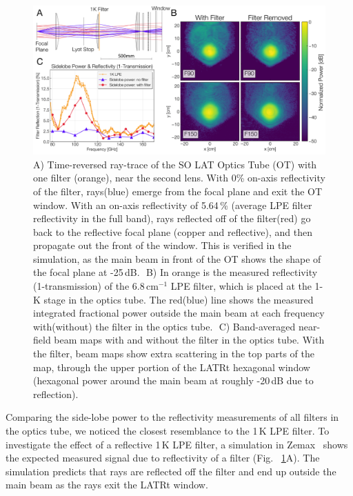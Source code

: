 \begin{figure}[t]
    \centering
    \includegraphics[width = .95\textwidth]{Figures/filter_fig.pdf}
    \caption{A) Time-reversed ray-trace of the SO LAT Optics Tube (OT) with one filter (orange), near the second lens.  With 0\% on-axis reflectivity of the filter, rays(blue) emerge from the focal plane and exit the OT window.  With an on-axis reflectivity of 5.64\,\% (average LPE filter reflectivity in the full band), rays reflected off of the filter(red) go back to the reflective focal plane (copper and reflective), and then propagate out the front of the window.  This is verified in the simulation, as the main beam in front of the OT shows the shape of the focal plane at -25\,dB.  \,\,B) In orange is the measured reflectivity (1-transmission) of the 6.8\,cm$^{-1}$ LPE filter, which is placed at the 1-K stage in the optics tube.  The red(blue) line shows the measured integrated fractional power outside the main beam at each frequency with(without) the filter in the optics tube.  \,\,C) Band-averaged near-field beam maps with and without the filter in the optics tube.  With the filter, beam maps show extra scattering in the top parts of the map, through the upper portion of the LATRt hexagonal window (hexagonal power around the main beam at roughly -20\,dB due to reflection).}
    \label{fig:filter_info}
\end{figure}

Comparing the side-lobe power to the reflectivity measurements of all filters in the optics tube, we noticed the closest resemblance to the 1\,K LPE filter.  To investigate the effect of a reflective 1\,K LPE filter, a simulation in Zemax~\cite{zeemax} shows the expected measured signal due to reflectivity of a filter (Fig. ~\ref{fig:filter_info}A).  The simulation predicts that rays are reflected off the filter and end up outside the main beam as the rays exit the LATRt window.

